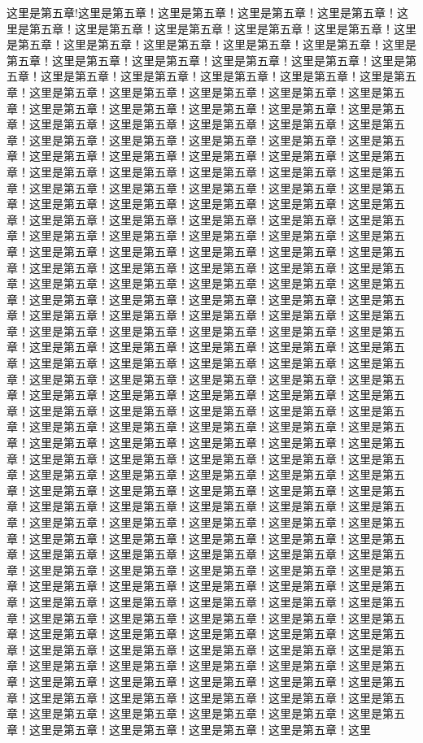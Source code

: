 
\label{sec5}
这里是第五章!这里是第五章！这里是第五章！这里是第五章！这里是第五章！这里是第五章！这里是第五章！这里是第五章！这里是第五章！这里是第五章！这里是第五章！这里是第五章！这里是第五章！这里是第五章！这里是第五章！这里是第五章！这里是第五章！这里是第五章！这里是第五章！这里是第五章！这里是第五章！这里是第五章！这里是第五章！这里是第五章！这里是第五章！这里是第五章！这里是第五章！这里是第五章！这里是第五章！这里是第五章！这里是第五章！这里是第五章！这里是第五章！这里是第五章！这里是第五章！这里是第五章！这里是第五章！这里是第五章！这里是第五章！这里是第五章！这里是第五章！这里是第五章！这里是第五章！这里是第五章！这里是第五章！这里是第五章！这里是第五章！这里是第五章！这里是第五章！这里是第五章！这里是第五章！这里是第五章！这里是第五章！这里是第五章！这里是第五章！这里是第五章！这里是第五章！这里是第五章！这里是第五章！这里是第五章！这里是第五章！这里是第五章！这里是第五章！这里是第五章！这里是第五章！这里是第五章！这里是第五章！这里是第五章！这里是第五章！这里是第五章！这里是第五章！这里是第五章！这里是第五章！这里是第五章！这里是第五章！这里是第五章！这里是第五章！这里是第五章！这里是第五章！这里是第五章！这里是第五章！这里是第五章！这里是第五章！这里是第五章！这里是第五章！这里是第五章！这里是第五章！这里是第五章！这里是第五章！这里是第五章！这里是第五章！这里是第五章！这里是第五章！这里是第五章！这里是第五章！这里是第五章！这里是第五章！这里是第五章！这里是第五章！这里是第五章！这里是第五章！这里是第五章！这里是第五章！这里是第五章！这里是第五章！这里是第五章！这里是第五章！这里是第五章！这里是第五章！这里是第五章！这里是第五章！这里是第五章！这里是第五章！这里是第五章！这里是第五章！这里是第五章！这里是第五章！这里是第五章！这里是第五章！这里是第五章！这里是第五章！这里是第五章！这里是第五章！这里是第五章！这里是第五章！这里是第五章！这里是第五章！这里是第五章！这里是第五章！这里是第五章！这里是第五章！这里是第五章！这里是第五章！这里是第五章！这里是第五章！这里是第五章！这里是第五章！这里是第五章！这里是第五章！这里是第五章！这里是第五章！这里是第五章！这里是第五章！这里是第五章！这里是第五章！这里是第五章！这里是第五章！这里是第五章！这里是第五章！这里是第五章！这里是第五章！这里是第五章！这里是第五章！这里是第五章！这里是第五章！这里是第五章！这里是第五章！这里是第五章！这里是第五章！这里是第五章！这里是第五章！这里是第五章！这里是第五章！这里是第五章！这里是第五章！这里是第五章！这里是第五章！这里是第五章！这里是第五章！这里是第五章！这里是第五章！这里是第五章！这里是第五章！这里是第五章！这里是第五章！这里是第五章！这里是第五章！这里是第五章！这里是第五章！这里是第五章！这里是第五章！这里是第五章！这里是第五章！这里是第五章！这里是第五章！这里是第五章！这里是第五章！这里是第五章！这里是第五章！这里是第五章！这里是第五章！这里是第五章！这里是第五章！这里是第五章！这里是第五章！这里是第五章！这里是第五章！这里是第五章！这里是第五章！这里是第五章！这里是第五章！这里是第五章！这里是第五章！这里是第五章！这里是第五章！这里是第五章！这里是第五章！这里是第五章！这里是第五章！这里是第五章！这里是第五章！这里是第五章！这里是第五章！这里是第五章！这里是第五章！这里是第五章！这里是第五章！这里是第五章！这里是第五章！这里是第五章！这里是第五章！这里是第五章！这里是第五章！这里是第五章！这里是第五章！这里是第五章！这里是第五章！这里是第五章！这里是第五章！这里是第五章！这里